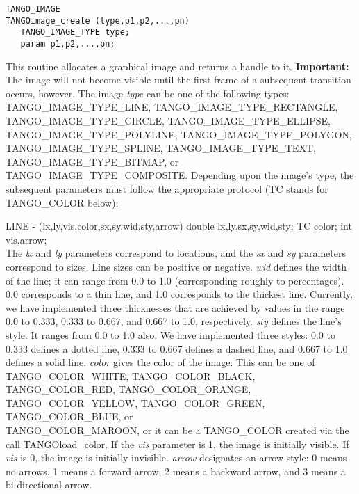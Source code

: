 \vspace{1em}
\begin{verbatim}
TANGO_IMAGE
TANGOimage_create (type,p1,p2,...,pn) 
   TANGO_IMAGE_TYPE type;
   param p1,p2,...,pn;
\end{verbatim}
This routine allocates a graphical image and returns a handle to it.
{\bf Important:} The image will not become visible until the first frame of a
subsequent transition occurs, however.  The image {\em type} can be
one of the following types: TANGO\_IMAGE\_TYPE\_LINE,
TANGO\_IMAGE\_TYPE\_RECTANGLE,\\
 TANGO\_IMAGE\_TYPE\_CIRCLE,
TANGO\_IMAGE\_TYPE\_ELLIPSE, TANGO\_IMAGE\_TYPE\_POLYLINE,
TANGO\_IMAGE\_TYPE\_POLYGON, TANGO\_IMAGE\_TYPE\_SPLINE,
TANGO\_IMAGE\_TYPE\_TEXT,\\
TANGO\_IMAGE\_TYPE\_BITMAP, or TANGO\_IMAGE\_TYPE\_COMPOSITE.  Depending
upon the image's type, the subsequent parameters must follow the
appropriate protocol (TC stands for TANGO\_COLOR below):

LINE - (lx,ly,vis,color,sx,sy,wid,sty,arrow) double
lx,ly,sx,sy,wid,sty; TC color; int vis,arrow;\\ 
The {\em lx} and {\em ly}
parameters correspond to locations, and the {\em sx} and {\em sy}
parameters correspond to sizes.  Line sizes can be positive or
negative.  {\em wid} defines the width of the line; it can range from
0.0 to 1.0 (corresponding roughly to percentages).  0.0 corresponds to
a thin line, and 1.0 corresponds to the thickest line.  Currently, we
have implemented three thicknesses that are achieved by values in the
range 0.0 to 0.333, 0.333 to 0.667, and 0.667 to 1.0, respectively.
{\em sty} defines the line's style.  It ranges from 0.0 to 1.0 also.
We have implemented three styles: 0.0 to 0.333 defines a dotted line,
0.333 to 0.667 defines a dashed line, and 0.667 to 1.0 defines a solid
line.  {\em color} gives the color of the image.  This can be one of
TANGO\_COLOR\_WHITE, TANGO\_COLOR\_BLACK, TANGO\_COLOR\_RED,
TANGO\_COLOR\_ORANGE,\\
 TANGO\_COLOR\_YELLOW, TANGO\_COLOR\_GREEN,
TANGO\_COLOR\_BLUE, or\\
 TANGO\_COLOR\_MAROON, or it can be a
TANGO\_COLOR created via the call TANGOload\_color. If the {\em vis}
parameter is 1, the image is initially visible.  If {\em vis} is 0,
the image is initially invisible.  {\em arrow} designates an arrow
style: 0 means no arrows, 1 means a forward arrow, 2 means a backward
arrow, and 3 means a bi-directional arrow.

